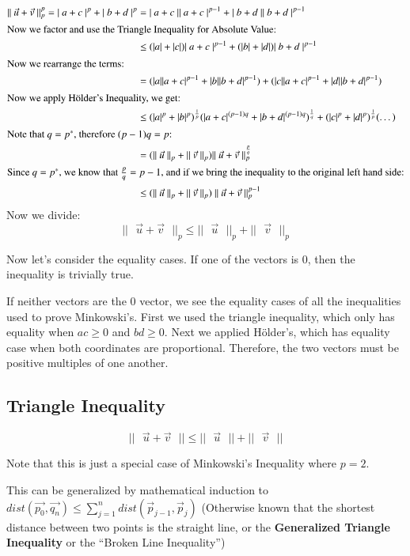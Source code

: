 \documentclass [12 pt, twoside] {book}
\newcommand\+{\text{ }}
\begin{document}
\begin{align*}
||\+\vec{u} + \vec{v}\+||_p^p = |\+a + c\+|^p + |\+b + d\+|^p &= |\+a + c\+||\+a + c\+|^{p - 1} + |\+b + d\+||\+b + d\+|^{p - 1}\\
\intertext{Now we factor and use the Triangle Inequality for Absolute Value:}
&\leq (|a| + |c|)|\+a + c\+|^{p - 1} + (|b| + |d|)|\+b + d\+|^{p - 1}\\
\intertext{Now we rearrange the terms:}
&= (|a||a + c|^{p - 1} + |b||b + d|^{p - 1}) + (|c||a + c|^{p - 1} + |d||b +
d|^{p - 1})\\
\intertext{Now we apply H\"{o}lder's Inequality, we get:}
&\leq (|a|^p + |b|^p)^{\frac{1}{p}}(|a + c|^{(p - 1)q} + |b + d|^{(p -
1)q})^{\frac{1}{q}} + (|c|^p + |d|^p)^{\frac{1}{p}}(\dots)\\
\intertext{Note that $q = p^*$, therefore $(p - 1)q = p$:}
&= (||\+\vec{u}\+||_p + ||\+\vec{v}\+||_p) ||\+\vec{u} + \vec{v}\+||_p^{\frac{p}{q}}\\
\intertext{Since $q = p^*$, we know that $\frac{p}{q} = p - 1$, and if we bring the
inequality to the original left hand side:}
&\leq (||\+\vec{u}\+||_p + ||\+\vec{v}\+||_p)\+||\+\vec{u} + \vec{v}\+||_p^{p - 1}
\end{align*}
Now we divide:
$$||\+\vec{u} + \vec{v}\+||_p \leq ||\+\vec{u}\+||_p + ||\+\vec{v}\+||_p$$

Now let's consider the equality cases. If one of the vectors is 0, then the
inequality is trivially true.

If neither vectors are the 0 vector, we see the equality cases of all the
inequalities used to prove Minkowski's. First we used the triangle inequality,
which only has equality when $ac \geq 0$ and $bd \geq 0$. Next we applied
H\"{o}lder's, which has equality case when both coordinates are proportional.
Therefore, the two vectors must be positive multiples of one another.

\subsection{Triangle Inequality}
$$||\+\vec{u} + \vec{v}\+|| \leq ||\+\vec{u}\+|| + ||\+\vec{v}\+||$$

Note that this is just a special case of Minkowski's Inequality where $p = 2$.

This can be generalized by mathematical induction to $dist(\vec{p_0}, \vec{q_n})
\leq \sum_{j = 1}^n dist(\vec{p}_{j - 1}, \vec{p}_{j})$ (Otherwise known that the
shortest distance between two points is the straight line, or the \textbf{Generalized
Triangle Inequality} or the ``Broken Line Inequality'')
\end{document}
